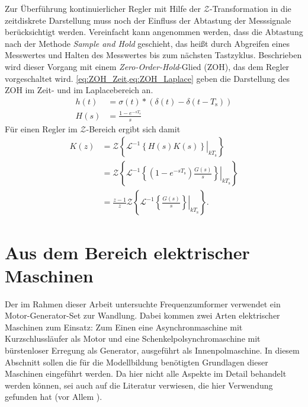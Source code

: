 Zur Überführung kontinuierlicher Regler mit Hilfe der $\mathcal{Z}$-Transformation in die zeitdiskrete Darstellung muss noch der Einfluss der Abtastung der Messsignale berücksichtigt werden. Vereinfacht kann angenommen werden, dass die Abtastung nach der Methode \emph{Sample and Hold} geschieht, das heißt durch Abgreifen eines Messwertes und Halten des Messwertes bis zum nächsten Tastzyklus. Beschrieben wird dieser Vorgang mit einem \emph{Zero-Order-Hold}-Glied (ZOH), das dem Regler vorgeschaltet wird. \cref{eq:ZOH_Zeit,eq:ZOH_Laplace} geben die Darstellung des ZOH im Zeit- und im Laplacebereich an.
\begin{align}
    h(t) &= \sigma(t)*\left(\delta(t) - \delta(t-T_{\mathrm{s}})\right) \label{eq:ZOH_Zeit}\\
    H(s) &= \frac{1 - e^{-sT_{\mathrm{s}}}}{s} \label{eq:ZOH_Laplace}
\end{align}
Für einen Regler im $\mathcal{Z}$-Bereich ergibt sich damit
\begin{equation}
\begin{split}\label{eq:ReglerZBereich}
    K(z) &= \mathcal{Z}\left\{ \left.\mathcal{L}^{-1}\left\{ H(s)K(s) \right\}\right|_{kT_{\mathrm{s}}} \right\} \\
    &= \mathcal{Z}\left\{ \left.\mathcal{L}^{-1}\left\{ (1 - e^{-sT_{\mathrm{s}}})\frac{G(s)}{s} \right\}\right|_{kT_{\mathrm{s}}} \right\} \\
    &= \frac{z-1}{z} \mathcal{Z}\left\{ \mathcal{L}^{-1}\left.\left\{\frac{G(s)}{s}\right\}\right|_{kT_{\mathrm{s}}} \right\}. 
\end{split}
\end{equation}

\section{Aus dem Bereich elektrischer Maschinen}
\label{sec:GrundlagenEMaschinen}
Der im Rahmen dieser Arbeit untersuchte Frequenzumformer verwendet ein Motor-Generator-Set zur Wandlung. Dabei kommen zwei Arten elektrischer Maschinen zum Einsatz: Zum Einen eine Asynchronmaschine mit Kurzschlussläufer als Motor und eine Schenkelpolsynchromaschine mit bürstenloser Erregung als Generator, ausgeführt als Innenpolmaschine. In diesem Abschnitt sollen die für die Modellbildung benötigten Grundlagen dieser Maschinen eingeführt werden. Da hier nicht alle Aspekte im Detail behandelt werden können, sei auch auf die Literatur verwiesen, die hier Verwendung gefunden hat (vor Allem \cites{binderElektrischeMaschinenUnd2012,beckElektrischeEnergietechnikEinfuhrung2008,mullerGrundlagenElektrischerMaschinen2005}).

